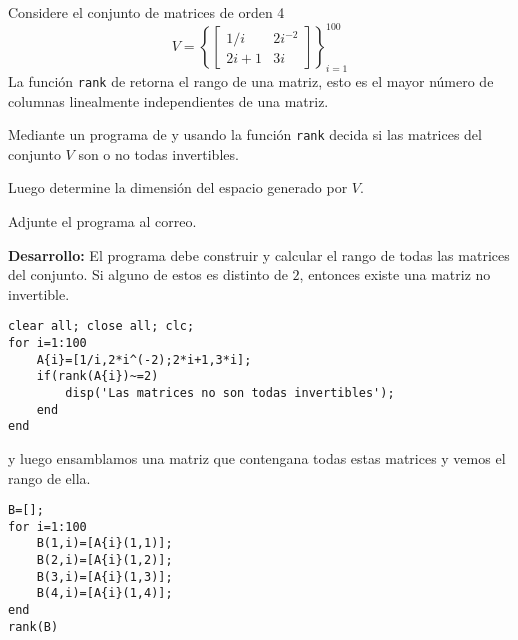 Considere el conjunto de matrices de orden 4
$$
V=
\left\{
\begin{bmatrix}
1/i & 2i^{-2} \\
2i+1 & 3i
\end{bmatrix}
\right\}
_{i=1}^{100}
$$
La funci\'on \texttt{rank} de \matlab retorna el rango de una matriz, esto es el mayor n\'umero de columnas linealmente independientes de una matriz.

Mediante un programa de \matlab y usando la funci\'on \texttt{rank} decida si las matrices del conjunto $V$ son o no todas invertibles.

Luego determine la dimensi\'on del espacio generado por $V$.

Adjunte el programa al correo. 

\textbf{Desarrollo:} 
El programa debe construir y calcular el rango de todas las matrices del conjunto. Si alguno de estos es distinto de $2$, entonces existe una matriz no invertible.
\begin{lstlisting}
clear all; close all; clc;
for i=1:100
	A{i}=[1/i,2*i^(-2);2*i+1,3*i];
    if(rank(A{i})~=2)
    	disp('Las matrices no son todas invertibles');
    end
end
\end{lstlisting}
\hfill\fbox{15 pt}

y luego ensamblamos una matriz que contengana todas estas matrices y vemos el rango de ella.
\begin{lstlisting}
B=[];
for i=1:100
    B(1,i)=[A{i}(1,1)];
    B(2,i)=[A{i}(1,2)];
    B(3,i)=[A{i}(1,3)];
    B(4,i)=[A{i}(1,4)];
end
rank(B)
\end{lstlisting}
\hfill\fbox{5 pt}